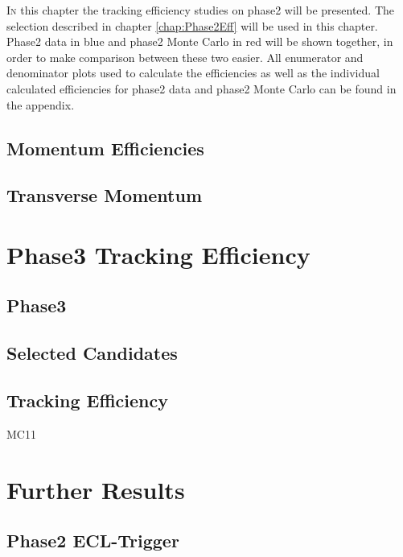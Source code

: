 \documentclass[a4paper,11pt,twosided,final,german,openbib,pdftex,listof=totoc,bibliography=totoc]{scrbook}
\begin{document}
\lettrine{I}{n} this chapter the tracking efficiency studies on phase2 will be presented. The selection described in chapter \ref{chap:Phase2Eff} will be used in this chapter. Phase2 data in blue and phase2 Monte Carlo in red will be shown together, in order to make comparison between these two easier. All enumerator and denominator plots used to calculate the efficiencies as well as the individual calculated efficiencies for phase2 data and phase2 Monte Carlo can be found in the appendix.


\section{Momentum Efficiencies}


\section{Transverse Momentum}


\chapter{Phase3 Tracking Efficiency}
\label{chp:TrackingEfficiencyPhase3}


\section{Phase3}

\section{Selected Candidates}

\section{Tracking Efficiency}







MC11


\chapter{Further Results}

\section{Phase2 ECL-Trigger}
\label{sec:ECLTriggerPhase2}
\end{document}
